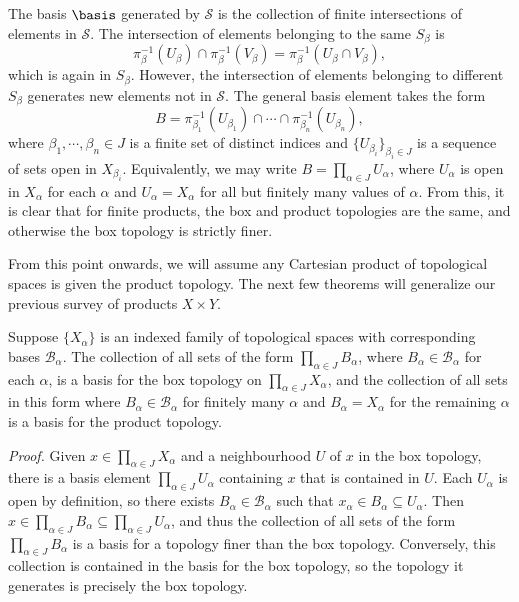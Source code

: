 The basis $\basis$ generated by $\mathcal{S}$ is the collection of finite intersections of elements in $\mathcal{S}$. The intersection of elements belonging to the same $S_\beta$ is
$$\pi_\beta^{-1}(U_\beta) \cap \pi_\beta^{-1}(V_\beta) = \pi_\beta^{-1}(U_\beta \cap V_\beta),$$
which is again in $S_\beta$. However, the intersection of elements belonging to different $S_\beta$ generates new elements not in $\mathcal{S}$. The general basis element takes the form
$$B = \pi_{\beta_1}^{-1}(U_{\beta_1}) \cap \cdots \cap \pi_{\beta_n}^{-1}(U_{\beta_n}),$$
where $\beta_1, \cdots, \beta_n \in J$ is a finite set of distinct indices and $\{U_{\beta_i}\}_{\beta_i \in J}$ is a sequence of sets open in $X_{\beta_i}$. Equivalently, we may write $B = \prod_{\alpha \in J}U_\alpha$, where $U_\alpha$ is open in $X_\alpha$ for each $\alpha$ and $U_\alpha = X_\alpha$ for all but finitely many values of $\alpha$. From this, it is clear that for finite products, the box and product topologies are the same, and otherwise the box topology is strictly finer.

From this point onwards, we will assume any Cartesian product of topological spaces is given the product topology. The next few theorems will generalize our previous survey of products $X \times Y$.

\begin{theorem}\label{2.47}
    Suppose $\{X_\alpha\}$ is an indexed family of topological spaces with corresponding bases $\mathcal{B}_\alpha$. The collection of all sets of the form $\prod_{\alpha \in J} B_\alpha$, where $B_\alpha \in \mathcal{B}_\alpha$ for each $\alpha$, is a basis for the box topology on $\prod_{\alpha \in J}X_\alpha$, and the collection of all sets in this form where $B_\alpha \in \mathcal{B}_\alpha$ for finitely many $\alpha$ and $B_\alpha = X_\alpha$ for the remaining $\alpha$ is a basis for the product topology.
\end{theorem}
{\it Proof.} Given $x \in \prod_{\alpha \in J} X_\alpha$ and a neighbourhood $U$ of $x$ in the box topology, there is a basis element $\prod_{\alpha \in J} U_\alpha$ containing $x$ that is contained in $U$. Each $U_\alpha$ is open by definition, so there exists $B_\alpha \in \mathcal{B}_\alpha$ such that $x_\alpha \in B_\alpha \subseteq U_\alpha$. Then $x \in \prod_{\alpha \in J} B_\alpha \subseteq \prod_{\alpha \in J} U_\alpha$, and thus the collection of all sets of the form $\prod_{\alpha \in J} B_\alpha$ is a basis for a topology finer than the box topology. Conversely, this collection is contained in the basis for the box topology, so the topology it generates is precisely the box topology.

